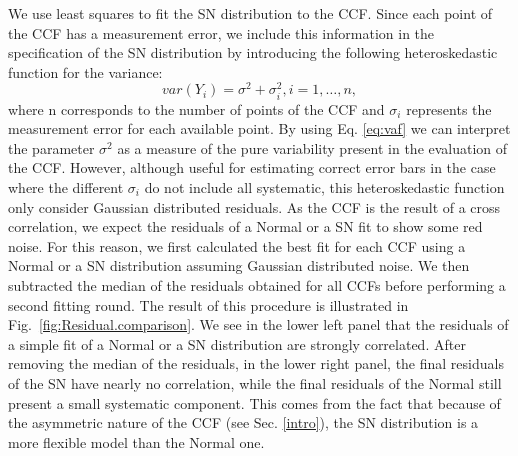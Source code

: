 \documentclass[11pt, oneside]{article}
\begin{document}
We use least squares to fit the SN distribution to the CCF. Since each point of the CCF has a measurement error, we include this information in the specification of the SN distribution by introducing the following heteroskedastic function for the variance:
%
\begin{equation}
var(Y_{i})=\sigma^{2}+\sigma_{i}^{2}, i = 1, \dots, n,
\label{eq:vaf}
\end{equation}
%
where n corresponds to the number of points of the CCF and $\sigma_{i}$ represents the measurement error for each available point. By using Eq. \ref{eq:vaf} we can interpret the parameter $\sigma^{2}$ as a measure of the pure variability present in the evaluation of the CCF. However, although useful for estimating correct error bars in the case where the different $\sigma_{i}$ do not include all systematic, this heteroskedastic function only consider Gaussian distributed residuals. As the CCF is the result of a cross correlation, we expect the residuals of a Normal or a SN fit to show some red noise. For this reason, we first calculated the best fit for each CCF using a Normal or a SN distribution assuming Gaussian distributed noise. We then subtracted the median of the residuals obtained for all CCFs before performing a second fitting round. The result of this procedure is illustrated in Fig.~\ref{fig:Residual.comparison}. We see in the lower left panel that the residuals of a simple fit of a Normal or a SN distribution are strongly correlated. After removing the median of the residuals, in the lower right panel, the final residuals of the SN have nearly no correlation, while the final residuals of the Normal still present a small systematic component. This comes from the fact that because of the asymmetric nature of the CCF (see Sec. \ref{intro}), the SN distribution is a more flexible model than the Normal one.


\end{document}
